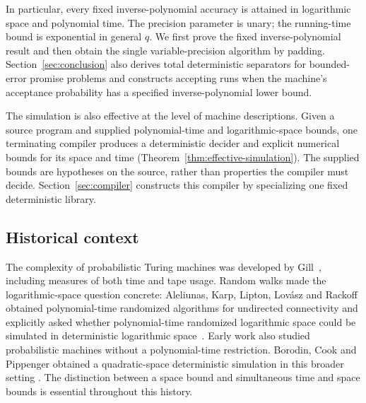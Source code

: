 In particular, every fixed inverse-polynomial accuracy is attained in
logarithmic space and polynomial time. The precision parameter is unary;
the running-time bound is exponential in general $q$. We first prove
the fixed inverse-polynomial result and then obtain the single
variable-precision algorithm by padding. Section~\ref{sec:conclusion}
also derives total deterministic separators for bounded-error promise
problems and constructs accepting runs when the machine's acceptance
probability has a specified inverse-polynomial lower bound.

The simulation is also effective at the level of machine descriptions.
Given a source program and supplied polynomial-time and logarithmic-space
bounds, one terminating compiler produces a deterministic decider and
explicit numerical bounds for its space and time
(Theorem~\ref{thm:effective-simulation}). The supplied bounds are
hypotheses on the source, rather than properties the compiler must decide.
Section~\ref{sec:compiler} constructs this compiler by specializing one
fixed deterministic library.

\subsection{Historical context}

The complexity of probabilistic Turing machines was developed by
Gill~\cite{Gill1977}, including measures of both time and tape usage.
Random walks made the logarithmic-space question concrete:
Aleliunas, Karp, Lipton, Lov\'asz and Rackoff obtained polynomial-time
randomized algorithms for undirected connectivity and explicitly asked
whether polynomial-time randomized logarithmic space could be simulated
in deterministic logarithmic space~\cite{AleliunasKLLR1979}.
Early work also studied probabilistic machines without a polynomial-time
restriction. Borodin, Cook and Pippenger obtained a quadratic-space
deterministic simulation in this broader setting
\cite{BorodinCookPippenger1983}.
The distinction between a space bound and simultaneous time and space
bounds is essential throughout this history.

